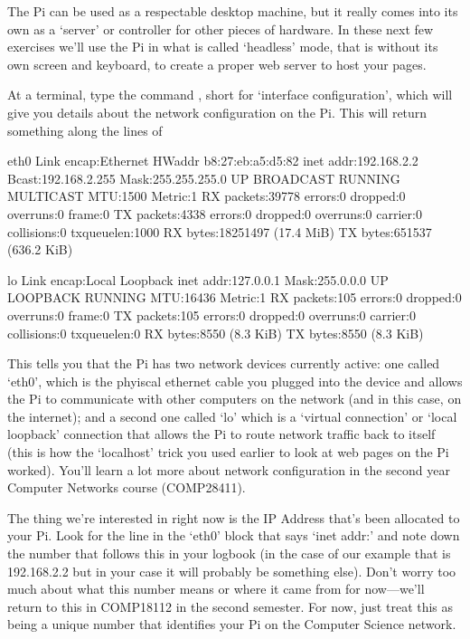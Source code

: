 The Pi can be used as a respectable desktop machine, but it really comes into its own as a `server' or controller for other pieces of hardware. In these next few exercises we'll use the Pi in what is called `headless' mode, that is without its own screen and keyboard, to create a proper web server to host your pages. 

At a terminal, type the command , short for `interface configuration', which will give you details about the network configuration on the Pi. This will return something along the lines of

\begin{ttoutenv}
eth0      Link encap:Ethernet  HWaddr b8:27:eb:a5:d5:82
          inet addr:192.168.2.2  Bcast:192.168.2.255  Mask:255.255.255.0
          UP BROADCAST RUNNING MULTICAST  MTU:1500  Metric:1
          RX packets:39778 errors:0 dropped:0 overruns:0 frame:0
          TX packets:4338 errors:0 dropped:0 overruns:0 carrier:0
          collisions:0 txqueuelen:1000
          RX bytes:18251497 (17.4 MiB)  TX bytes:651537 (636.2 KiB)

lo        Link encap:Local Loopback
          inet addr:127.0.0.1  Mask:255.0.0.0
          UP LOOPBACK RUNNING  MTU:16436  Metric:1
          RX packets:105 errors:0 dropped:0 overruns:0 frame:0
          TX packets:105 errors:0 dropped:0 overruns:0 carrier:0
          collisions:0 txqueuelen:0
          RX bytes:8550 (8.3 KiB)  TX bytes:8550 (8.3 KiB)
\end{ttoutenv}

This tells you that the Pi has two network devices currently active: one called `eth0', which is the phyiscal ethernet cable you plugged into the device and allows the Pi to communicate with other computers on the network (and in this case, on the internet); and a second one called `lo' which is a `virtual connection' or `local loopback' connection that allows the Pi to route network traffic back to itself (this is how the `localhost' trick you used earlier to look at web pages on the Pi worked). You'll learn a lot more about network configuration in the second year Computer Networks course (COMP28411). 

The thing we're interested in right now is the IP Address that's been allocated to your Pi. Look for the line in the `eth0' block that says `inet addr:' and note down the number that follows this in your logbook (in the case of our example that is 192.168.2.2 but in your case it will probably be something else). Don't worry too much about what this number means or where it came from for now---we'll return to this in COMP18112 in the second semester. For now, just treat this as being a unique number that identifies your Pi on the Computer Science network. 

